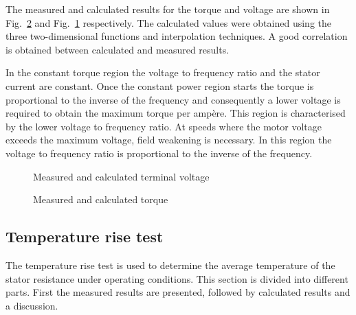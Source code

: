 The measured and calculated results for the torque and voltage are shown in Fig.~\ref{fig:T_measured} and Fig.~\ref{fig:U1_measured} respectively. The calculated values were obtained using the three two-dimensional functions and interpolation techniques. A good correlation is obtained between calculated and measured results.

In the constant torque region the voltage to frequency ratio and the stator current are constant. Once the constant power region starts the torque is proportional to the inverse of the frequency and consequently a lower voltage is required to obtain the maximum torque per amp\`ere. This region is characterised by the lower voltage to frequency ratio. At speeds where the motor voltage exceeds the maximum
voltage, field weakening is necessary. In this region the voltage to frequency ratio is proportional to the inverse of the frequency.
\begin{figure}[htbp]
  \centering
    
  \caption{Measured and calculated terminal voltage}
  \label{fig:U1_measured}
\end{figure}

\begin{figure}
  \centering
    
  \caption{Measured and calculated torque}
  \label{fig:T_measured}
\end{figure}


\subsection{Temperature rise test}
The temperature rise test is used to determine the average temperature of the stator resistance under operating conditions. This section is divided into different parts. First the measured results are presented, followed by calculated results and a discussion.

